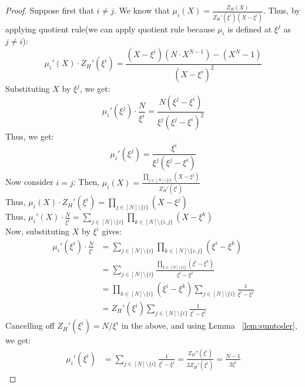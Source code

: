 \documentclass[sigconf]{acmart}
\begin{document}
	\begin{proof}
		Suppose first that $i \neq j$.
		We know that $\mu_i(X)= \frac{Z_H(X)}{Z_H'(\xi^i)(X-\xi^i)}$.
		Thus, by applying quotient rule(we can apply quotient rule because $\mu_i$ is defined at $\xi^j$ as $j\neq i$):
		$$\mu_i'(X) \cdot Z_H'(\xi^i)= \frac{(X-\xi^i)(N\cdot X^{N-1})-(X^N-1)}{(X-\xi^i)^2}$$
		Substituting $X$ by $\xi^j$, we get:
		$$\mu_i'(\xi^j) \cdot \frac{N}{\xi^i}= \frac{N(\xi^j-\xi^i)}{\xi^j (\xi^j-\xi^i)^2}$$
		Thus, we get:
		$$\mu_i'(\xi^j)=\frac{\xi^i}{\xi^j(\xi^j-\xi^i)}$$
		Now consider $i=j$:
		Then, $\mu_i(X)=\frac{\prod_{j \in [N] \setminus \{i\}}(X-\xi^j)}{Z_H'(\xi^i)}$\\
		Thus,  $\mu_i(X)\cdot Z_H'(\xi^i)=\prod_{j \in [N] \setminus \{i\}}(X-\xi^j)$\\
		Thus, $\mu_i'(X) \cdot \frac{N}{\xi^i}=\sum_{j \in [N] \setminus \{i\}}\prod_{k \in [N]\setminus\{i,j\}}(X-\xi^k)$\\
		Now, substituting $X$ by $\xi^i$ gives:
		\begin{align*}
			\mu_i'(\xi^i) \cdot \frac{N}{\xi^i} &= \sum_{j \in [N] \setminus \{i\}}\prod_{k \in [N]\setminus\{i,j\}}(\xi^i-\xi^k) \\
			&=\sum_{j \in [N] \setminus \{i\}}\frac{\prod_{k \in [N]\setminus\{i\}}(\xi^i-\xi^k)}{\xi^i-\xi^j} \\
			&= \prod_{k \in [N]\setminus\{i\}}(\xi^i-\xi^k)\sum_{j\in [N]\setminus \{i\}}\frac{1}{\xi^i-\xi^j} \\
			&=Z_H'(\xi^i)\sum_{j\in [N]\setminus \{i\}}\frac{1}{\xi^i-\xi^j}
		\end{align*}
		Cancelling off $Z_H'(\xi^i)=N/\xi^i$ in the above, and using Lemma ~\ref{lem:sumtoder}, we get:
		\begin{align*}
			\mu_i'(\xi^i) &= \sum_{j\in [N]\setminus \{i\}}\frac{1}{\xi^i-\xi^j} =\frac{Z_H''(\xi^i)}{2 Z_H'(\xi^i)}
			=\frac{N-1}{2\xi^i}
		\end{align*}
		
	\end{proof}
	
\end{document}

